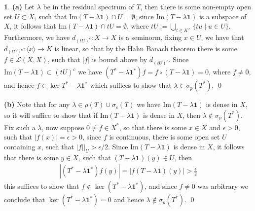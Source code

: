 \documentclass[11pt]{article}
\theoremstyle{definition}
\newtheorem{pb}{}
\newcommand{\set}[1]{\{#1\}}
\newcommand{\abs}[1]{\left\vert#1\right\vert}
\newcommand{\im}{\text{Im}}
\newcommand{\gen}[1]{\langle #1 \rangle}
\begin{document}
    \begin{pb}
        \textbf{(a)} Let \(\lambda\) be in the residual spectrum of \(T\), then there is some non-empty open set \(U \subset X\), such that \(\im(T - \lambda\mathbf{1}) \cap U = \emptyset\), since \(\im(T - \lambda\mathbf{1})\) is a subspace of \(X\), it follows that \(\im(T - \lambda\mathbf{1}) \cap t U = \emptyset\), where \(tU := \bigcup_{t \in K^\times}\set{tu \mid u \in U}\). Furthermore, we have \(d_{(tU)^c}: X \to X\) is a seminorm, fixing \(x \in U\), we have that \(d_{(tU)^c}: \gen{x} \to K\) is linear, so that by the Hahn Banach theorem there is some \(f \in \mathcal{L}(X,X)\), such that \(\abs{f}\) is bound above by \(d_{(tU)^c}\). Since \(\im(T - \lambda\mathbf{1}) \subset (tU)^c\) we have \((T^* - \lambda\mathbf{1}^*)f =  f\circ(T - \lambda\mathbf{1}) = 0\), where \(f \neq 0\), and hence \(f \in \ker T^* - \lambda\mathbf{1}^*\) which suffices to show that \(\lambda \in \sigma_p(T^*)\). \qed

        \textbf{(b)} Note that for any \(\lambda \in \rho(T)\cup\sigma_c(T)\) we have \(\im(T-\lambda\mathbf{1})\) is dense in \(X\), so it will suffice to show that if \(\im(T-\lambda\mathbf{1})\) is dense in \(X\), then \(\lambda \not \in \sigma_p(T^*)\). Fix such a \(\lambda\), now suppose \(0 \neq f \in X^*\), so that there is some \(x \in X\) and \(\epsilon > 0\), such that \(\abs{f(x)} = \epsilon > 0\), since \(f\) is continuous, there is some open set \(U\) containing \(x\), such that \(\abs{f}\vert_U > \epsilon/2\). Since \(\im(T - \lambda\mathbf{1})\) is dense in \(X\), it follows that there is some \(y \in X\), such that \((T - \lambda\mathbf{1})(y) \in U\), then
        \begin{align*}
            \abs{(T^* - \lambda\mathbf{1}^*)f(y)} = \abs{f(T - \lambda\mathbf{1})(y)} > \frac{\epsilon}{2}
        \end{align*}
        this suffices to show that \(f \not \in \ker(T^* - \lambda\mathbf{1}^*)\), and since \(f \neq 0\) was arbitrary we conclude that \(\ker(T^* - \lambda\mathbf{1}^*) = 0\) and hence \(\lambda \not \in \sigma_p(T^*)\). \qed
        

\end{pb}
\end{document}

